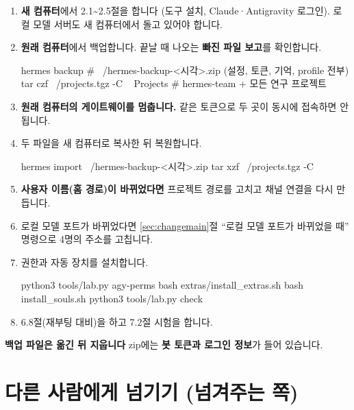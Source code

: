 \documentclass[10pt,a4paper,oneside]{report}
\newcommand{\sidebox}[4]{%
  \begin{tcolorbox}[enhanced,colback=#2,frame hidden,boxrule=0pt,arc=3pt,
    borderline west={3pt}{0pt}{#1},left=10pt,right=8pt,top=5pt,bottom=5pt,before skip=0.6em,after skip=0.8em]
  {\color{#1}\bfseries #3}\hspace{0.7em}#4
  \end{tcolorbox}}
\newcommand{\warn}[2]{\sidebox{warnc}{warnbg}{#1}{#2}}
\newcommand{\cmd}[1]{\textcolor{inlinefg}{\texttt{\detokenize{#1}}}}
\begin{document}
\begin{enumerate}[label=\textbf{\arabic*.}]
\item \textbf{새 컴퓨터}에서 2.1\textasciitilde2.5절을 합니다 (도구 설치, Claude·Antigravity 로그인). 로컬 모델 서버도 새 컴퓨터에서 돌고 있어야 합니다.
\item \textbf{원래 컴퓨터}에서 백업합니다. 끝날 때 나오는 \textbf{빠진 파일 보고}를 확인합니다.
\begin{sh}
hermes backup                         # ~/hermes-backup-<시각>.zip (설정, 토큰, 기억, profile 전부)
tar czf ~/projects.tgz -C ~ Projects  # hermes-team + 모든 연구 프로젝트
\end{sh}
\item \textbf{원래 컴퓨터의 게이트웨이를 멈춥니다.} 같은 토큰으로 두 곳이 동시에 접속하면 안 됩니다.
\item 두 파일을 새 컴퓨터로 복사한 뒤 복원합니다.
\begin{sh}
hermes import ~/hermes-backup-<시각>.zip
tar xzf ~/projects.tgz -C ~
\end{sh}
\item \textbf{사용자 이름(홈 경로)이 바뀌었다면} 프로젝트 경로를 고치고 채널 연결을 다시 만듭니다.
\item 로컬 모델 포트가 바뀌었다면 \ref{sec:changemain}절 ``로컬 모델 포트가 바뀌었을 때'' 명령으로 4명의 주소를 고칩니다.
\item 권한과 자동 장치를 설치합니다.
\begin{sh}
python3 tools/lab.py agy-perms
bash extras/install_extras.sh
bash install_souls.sh
python3 tools/lab.py check
\end{sh}
\item 6.8절(재부팅 대비)을 하고 7.2절 시험을 합니다.
\end{enumerate}

\warn{백업 파일은 옮긴 뒤 지웁니다}{\cmd{hermes backup} zip에는 \textbf{봇 토큰과 로그인 정보}가 들어 있습니다.}

\chapter{다른 사람에게 넘기기 (넘겨주는 쪽)}
\end{document}
